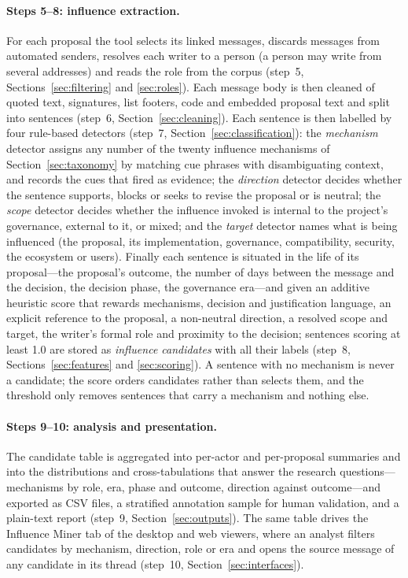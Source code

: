 \paragraph{Steps 5--8: influence extraction.} For each proposal the tool selects its linked messages, discards messages from automated senders, resolves each writer to a person (a person may write from several addresses) and reads the role from the corpus (step~5, Sections~\ref{sec:filtering} and \ref{sec:roles}). Each message body is then cleaned of quoted text, signatures, list footers, code and embedded proposal text and split into sentences (step~6, Section~\ref{sec:cleaning}). Each sentence is then labelled by four rule-based detectors (step~7, Section~\ref{sec:classification}): the \emph{mechanism} detector assigns any number of the twenty influence mechanisms of Section~\ref{sec:taxonomy} by matching cue phrases with disambiguating context, and records the cues that fired as evidence; the \emph{direction} detector decides whether the sentence supports, blocks or seeks to revise the proposal or is neutral; the \emph{scope} detector decides whether the influence invoked is internal to the project's governance, external to it, or mixed; and the \emph{target} detector names what is being influenced (the proposal, its implementation, governance, compatibility, security, the ecosystem or users). Finally each sentence is situated in the life of its proposal---the proposal's outcome, the number of days between the message and the decision, the decision phase, the governance era---and given an additive heuristic score that rewards mechanisms, decision and justification language, an explicit reference to the proposal, a non-neutral direction, a resolved scope and target, the writer's formal role and proximity to the decision; sentences scoring at least 1.0 are stored as \emph{influence candidates} with all their labels (step~8, Sections~\ref{sec:features} and \ref{sec:scoring}). A sentence with no mechanism is never a candidate; the score orders candidates rather than selects them, and the threshold only removes sentences that carry a mechanism and nothing else.

\paragraph{Steps 9--10: analysis and presentation.} The candidate table is aggregated into per-actor and per-proposal summaries and into the distributions and cross-tabulations that answer the research questions---mechanisms by role, era, phase and outcome, direction against outcome---and exported as CSV files, a stratified annotation sample for human validation, and a plain-text report (step~9, Section~\ref{sec:outputs}). The same table drives the Influence Miner tab of the desktop and web viewers, where an analyst filters candidates by mechanism, direction, role or era and opens the source message of any candidate in its thread (step~10, Section~\ref{sec:interfaces}).

